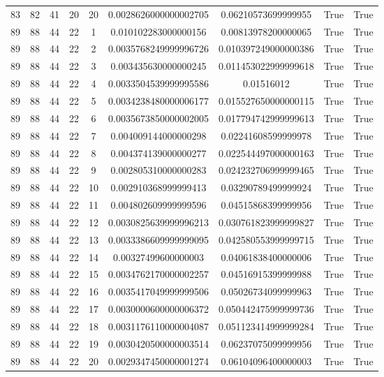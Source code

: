 \documentclass[a4paper,11pt]{article}
\begin{document}
\begin{landscape}
\begin{longtable}{ccccccccc}
83 & 82 & 41 & 20 & 20 & 0.0028626000000002705 & 0.06210573699999955 & True & True \\
89 & 88 & 44 & 22 & 1 & 0.010102283000000156 & 0.00813978200000065 & True & True \\
89 & 88 & 44 & 22 & 2 & 0.0035768249999996726 & 0.010397249000000386 & True & True \\
89 & 88 & 44 & 22 & 3 & 0.003435630000000245 & 0.011453022999999618 & True & True \\
89 & 88 & 44 & 22 & 4 & 0.0033504539999995586 & 0.01516012 & True & True \\
89 & 88 & 44 & 22 & 5 & 0.0034238480000006177 & 0.015527650000000115 & True & True \\
89 & 88 & 44 & 22 & 6 & 0.0035673850000002005 & 0.017794742999999613 & True & True \\
89 & 88 & 44 & 22 & 7 & 0.004009144000000298 & 0.02241608599999978 & True & True \\
89 & 88 & 44 & 22 & 8 & 0.004374139000000277 & 0.022544497000000163 & True & True \\
89 & 88 & 44 & 22 & 9 & 0.002805310000000283 & 0.024232706999999465 & True & True \\
89 & 88 & 44 & 22 & 10 & 0.002910368999999413 & 0.03290789499999924 & True & True \\
89 & 88 & 44 & 22 & 11 & 0.004802609999999596 & 0.04515868399999956 & True & True \\
89 & 88 & 44 & 22 & 12 & 0.0030825639999996213 & 0.030761823999999827 & True & True \\
89 & 88 & 44 & 22 & 13 & 0.0033386609999999095 & 0.042580553999999715 & True & True \\
89 & 88 & 44 & 22 & 14 & 0.00327499600000003 & 0.04061838400000006 & True & True \\
89 & 88 & 44 & 22 & 15 & 0.0034762170000002257 & 0.04516915399999988 & True & True \\
89 & 88 & 44 & 22 & 16 & 0.0035417049999999506 & 0.05026734099999963 & True & True \\
89 & 88 & 44 & 22 & 17 & 0.0030000600000006372 & 0.050442475999999736 & True & True \\
89 & 88 & 44 & 22 & 18 & 0.0031176110000004087 & 0.051123414999999284 & True & True \\
89 & 88 & 44 & 22 & 19 & 0.0030420500000003514 & 0.06237075099999956 & True & True \\
89 & 88 & 44 & 22 & 20 & 0.0029347450000001274 & 0.06104096400000003 & True & True \\

\end{longtable}
\end{landscape}
\end{document}
